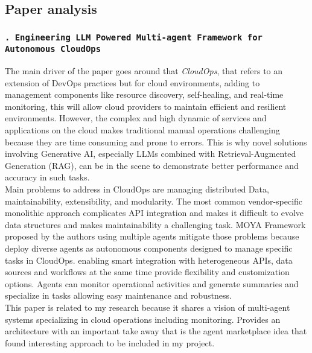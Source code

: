 \documentclass[11pt,a4paper]{article}
\begin{document}
\subsection*{Paper analysis}
\setcounter{papernum}{1}

\subsubsection*{\texttt{. Engineering LLM Powered Multi-agent Framework for Autonomous CloudOps \cite{11030040} }}

The main driver of the paper goes around that \textit{CloudOps}, that refers to an extension of DevOps practices but for cloud environments, adding to management components like resource discovery, self-healing, and real-time monitoring, this will allow cloud providers to maintain efficient and resilient environments. However, the complex and high dynamic of services and applications on the cloud makes traditional manual operations challenging because they are time consuming and prone to errors. This is why novel solutions involving Generative AI, especially LLMs combined with Retrieval-Augmented Generation (RAG), can be in the scene to demonstrate better performance and accuracy in such tasks. 
\\

Main problems to address in CloudOps are managing distributed Data, maintainability, extensibility, and modularity. The most common vendor-speciﬁc monolithic approach complicates API integration and makes it difficult to evolve data structures and makes maintainability a challenging task. MOYA Framework proposed by the authors using multiple agents mitigate those problems because deploy diverse agents as autonomous components designed to manage speciﬁc tasks in CloudOps. enabling smart integration with heterogeneous APIs, data sources and workflows at the same time provide flexibility and customization options. Agents can monitor operational activities and generate summaries and specialize in tasks allowing easy maintenance and robustness. 
\\

This paper is related to my research because it shares a vision of multi-agent systems specializing in cloud operations including monitoring. Provides an architecture with an important take away that is the agent marketplace idea that found interesting approach to be included in my project. 
\\
\end{document}
